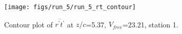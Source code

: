 \begin{figure}[H]
\centering
\texttt{[image: figs/run\_5/run\_5\_rt\_contour]}
\caption{Contour plot of $\overline{r^\prime t^\prime}$ at $z/c$=5.37, $V_{free}$=23.21, station 1.}
\label{fig:run_5_rt_contour}
\end{figure}


